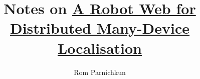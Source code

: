 \documentclass[twocolumn]{article}
\begin{document}
\title{Notes on \href{https://arxiv.org/pdf/2202.03314.pdf}{A Robot Web for Distributed Many-Device Localisation}}
\author{Rom Parnichkun}

\maketitle
\end{document}
